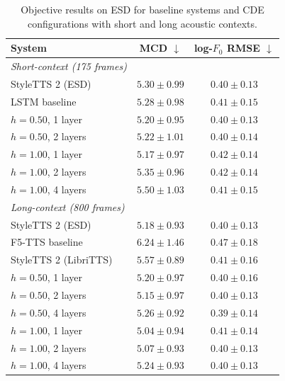 \begin{table}[t]
  \centering
  \caption{Objective results on ESD for baseline systems and CDE configurations with short and long acoustic contexts.}
  \label{tab:exp4_mcd_f0}
  \begin{tabular}{lcc}
    \toprule
    System & MCD $\downarrow$ & log-$F_0$ RMSE $\downarrow$ \\
    \midrule
    \textit{Short-context (175 frames)} & & \\
    StyleTTS 2 (ESD) & $5.30 \pm 0.99$ & \cellcolor{bestblue}$\mathbf{0.40} \pm 0.13$ \\
    LSTM baseline & $5.28 \pm 0.98$ & \cellcolor{secondorange}$0.41 \pm 0.15$ \\
    \midrule
    $h = 0.50$, 1 layer & \cellcolor{secondorange}$\mathbf{5.20} \pm 0.95$ & \cellcolor{bestblue}$\mathbf{0.40} \pm 0.13$ \\
    $h = 0.50$, 2 layers & $5.22 \pm 1.01$ & \cellcolor{bestblue}$\mathbf{0.40} \pm 0.14$ \\
    $h = 1.00$, 1 layer & \cellcolor{bestblue}$\mathbf{5.17} \pm 0.97$ & \cellcolor{worstred}$0.42 \pm 0.14$ \\
    $h = 1.00$, 2 layers & $5.35 \pm 0.96$ & \cellcolor{worstred}$0.42 \pm 0.14$ \\
    $h = 1.00$, 4 layers & \cellcolor{worstred}$5.50 \pm 1.03$ & \cellcolor{secondorange}$0.41 \pm 0.15$ \\
    \midrule
    \textit{Long-context (800 frames)} & & \\
    StyleTTS 2 (ESD) & $5.18 \pm 0.93$ & \cellcolor{secondorange}$0.40 \pm 0.13$ \\
    F5-TTS baseline & \cellcolor{worstred}$6.24 \pm 1.46$ & \cellcolor{worstred}$0.47 \pm 0.18$ \\
    StyleTTS 2 (LibriTTS) & $5.57 \pm 0.89$ & $0.41 \pm 0.16$ \\
     $h = 0.50$, 1 layer & $5.20 \pm 0.97$ & \cellcolor{secondorange}$0.40 \pm 0.16$ \\
     $h = 0.50$, 2 layers & $5.15 \pm 0.97$ & \cellcolor{secondorange}$0.40 \pm 0.13$ \\
     $h = 0.50$, 4 layers & $5.26 \pm 0.92$ & \cellcolor{bestblue}$0.39 \pm 0.14$ \\
     $h = 1.00$, 1 layer & \cellcolor{bestblue}$5.04 \pm 0.94$ & $0.41 \pm 0.14$ \\
     $h = 1.00$, 2 layers & \cellcolor{secondorange}$5.07 \pm 0.93$ & \cellcolor{secondorange}$0.40 \pm 0.13$ \\
     $h = 1.00$, 4 layers & $5.24 \pm 0.93$ & \cellcolor{secondorange}$0.40 \pm 0.13$ \\
    \bottomrule
  \end{tabular}
\end{table}

